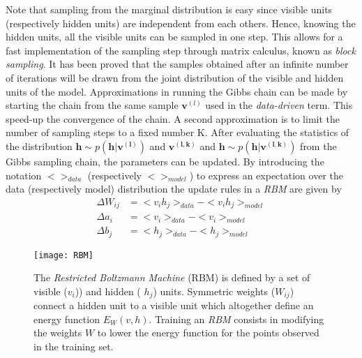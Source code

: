 \documentclass[letterpaper]{article}
\begin{document}
Note that sampling from the marginal distribution is easy since visible units (respectively hidden units) are independent from each others. Hence, knowing the hidden units, all the visible units can be sampled in one step. This allows for a fast implementation of the sampling step through matrix calculus, known as \textit{block sampling}.
It has been proved \cite{bengio2009learning} that the samples obtained after an infinite number of iterations will be drawn from the joint distribution of the visible and hidden units of the model. Approximations in running the Gibbs chain can be made by starting the chain from the same sample $\bm{v}^{(l)}$ used in the \textit{data-driven} term. This speed-up the convergence of the chain. A second approximation is to limit the number of sampling steps to a fixed number K. After evaluating the statistics of the distribution $\bm{h} \sim p(\bm{h}|\bm{v^{(l)}})$ and $\bm{v^{(l,k)}}$ and $\bm{h}\sim p(\bm{h}|\bm{v^{(l,k)}})$ from the Gibbs sampling chain, the parameters can be updated. By introducing the notation $<>_{data}$ (respectively $<>_{model}$) to express an expectation over the data (respectively model) distribution the update rules in a \textit{RBM} are given by
\begin{align}
\Delta W_{ij} &= <v_{i}h_{j} >_{data} - <v_{i}h_{j} >_{model}\\
\Delta a_{i} &= <v_{i}>_{data} - <v_{i}>_{model}\\
\Delta b_{j} &= <h_{j} >_{data} - <h_{j} >_{model}
\end{align}
\begin{figure}
\centering
\texttt{[image: RBM]}
\caption{The \textit{Restricted Boltzmann Machine} (RBM) is defined by a set of visible ($v_{i}$)) and hidden ( $h_{j}$) units.  Symmetric weights ($W_{ij}$) connect a hidden unit to a visible unit which altogether define an energy function $E_{W}(v,h)$. Training an \textit{RBM} consists in modifying the weights $W$ to lower the energy function for the points observed in the training set.}
\label{fig:RBM}
\end{figure}
\end{document}
